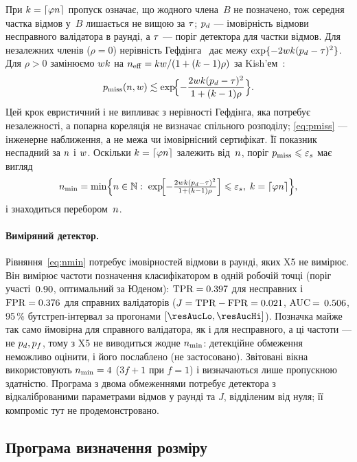 При $k=\lceil\varphi n\rceil$ пропуск означає, що жодного члена~$B$ не позначено,
тож середня частка відмов у~$B$ лишається не вищою за $\tau$; $p_{d}$ ---
імовірність відмови несправного валідатора в раунді, а $\tau$ --- поріг
детектора для частки відмов. Для незалежних членів ($\rho=0$) нерівність
Гефдінга~\cite{hoeffding1963} дає межу $\exp\{-2wk(p_{d}-\tau)^{2}\}$. Для
$\rho>0$ замінюємо $wk$ на $n_{\mathrm{eff}}=kw/(1+(k-1)\rho)$ за
Kish'ем~\cite{kish1965}:\label{st:rho}
\begin{equation}
\pmiss(\n,\w)\lesssim\exp\!\Bigl\{-\frac{2\w\kf(\pd-\thr)^{2}}{1+(\kf-1)\rho}\Bigr\}.
\label{eq:pmiss}
\end{equation}
Цей крок евристичний і не випливає з нерівності Гефдінга, яка потребує
незалежності, а попарна кореляція не визначає спільного розподілу;
\eqref{eq:pmiss} --- інженерне наближення, а не межа чи імовірнісний
сертифікат. Її показник неспадний за $n$ і $w$. Оскільки $k=\lceil\varphi n\rceil$
залежить від~$n$, поріг $p_{\mathrm{miss}}\leqslant\varepsilon_{s}$ має вигляд
\begin{equation}
\nmin=\min\Bigl\{\n\in\mathbb{N}:\;
\exp\!\Bigl[-\tfrac{2\w\kf(\pd-\thr)^{2}}{1+(\kf-1)\rho}\Bigr]\le\epss,\;
\kf=\lceil\phi\n\rceil\Bigr\},
\label{eq:nmin}
\end{equation}
і знаходиться перебором~$n$.

\paragraph{Виміряний детектор.}
Рівняння~\eqref{eq:nmin} потребує імовірностей відмови в раунді, яких X5 не
вимірює. Він вимірює частоти позначення класифікатором в одній робочій точці
(поріг участі~$0.90$, оптимальний за Юденом):
$\mathrm{TPR}=0.397$ для несправних і $\mathrm{FPR}=0.376$ для справних валідаторів
($J=\mathrm{TPR}-\mathrm{FPR}=0.021$, AUC$\,=\,0.506$, 95\,\% бутстреп-інтервал за
прогонами $[\resAucLo,\resAucHi]$). Позначка майже так само ймовірна
для справного валідатора, як і для несправного, а ці частоти --- не $p_{d},p_{f}$,
тому з X5 не виводиться жодне $\nmin$: детекційне обмеження неможливо оцінити, і
його послаблено (не застосовано). Звітовані вікна використовують
$\nmin=\resNminCase$ ($3f+1$ при $f=1$) і визначаються лише пропускною
здатністю. Програма з двома обмеженнями потребує детектора з відкаліброваними
параметрами відмов у раунді та $J$, відділеним від нуля; її компроміс тут не
продемонстровано.

\subsection{Програма визначення розміру}


